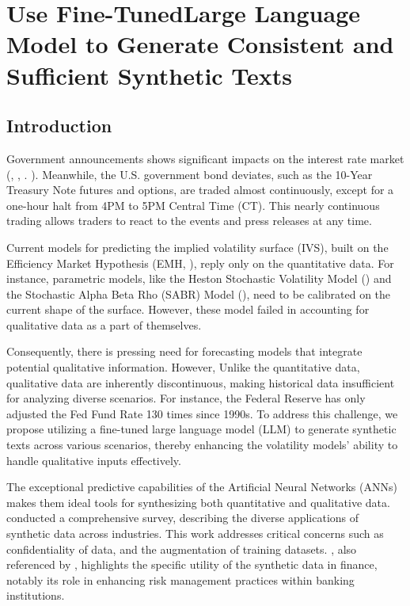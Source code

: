 \graphicspath{{Chapter2/Chapter2Figs/}{Chapter2/Chapter2Figs/}}
 
\chapter{Use Fine-TunedLarge Language Model to Generate Consistent and Sufficient Synthetic Texts}\label{ch:chapter:2}

\section{Introduction}\label{ch2:sec:introduction}  
Government announcements shows significant impacts on the interest rate market (\cite{vergote2012}, \cite{rosa2013financial}, \cite{jubinski2013fomc}. ). Meanwhile, the U.S. government bond deviates, such as the 10-Year Treasury Note futures and options, are traded almost continuously, except for a one-hour halt from 4PM to 5PM Central Time (CT). This nearly continuous trading allows traders to react to the events and press releases at any time. 

Current models for predicting the implied volatility surface (IVS),  built on the Efficiency Market Hypothesis (EMH, \cite{fama1970}), reply only on the quantitative data. For instance, parametric models, like the Heston Stochastic Volatility Model (\cite{Heston:1993}) and the Stochastic Alpha Beta Rho (SABR) Model (\cite{sabr2002}), need to be calibrated on the current shape of the surface. However, these model failed in accounting for qualitative data as a part of themselves. 

Consequently, there is pressing need for forecasting models that integrate potential qualitative information. However, Unlike the quantitative data, qualitative data are  inherently discontinuous, making historical data insufficient for analyzing diverse scenarios. For instance, the Federal Reserve has only adjusted the Fed Fund Rate 130 times since 1990s. To address this challenge, we propose utilizing a fine-tuned large language model (LLM) to generate synthetic texts across various scenarios, thereby enhancing the volatility models' ability to handle qualitative inputs effectively.


The exceptional predictive capabilities of the Artificial Neural Networks (ANNs) makes them ideal tools for synthesizing both quantitative and qualitative data. \cite{guo2024generative} conducted a comprehensive survey, describing the diverse applications of synthetic data across industries. This work addresses critical concerns such as confidentiality of data, and the augmentation of training datasets. \cite{potluru2023synthetic}, also referenced by \cite{assefa2020generating}, highlights the specific utility of the synthetic data in finance, notably its role in enhancing risk management practices within banking institutions.


